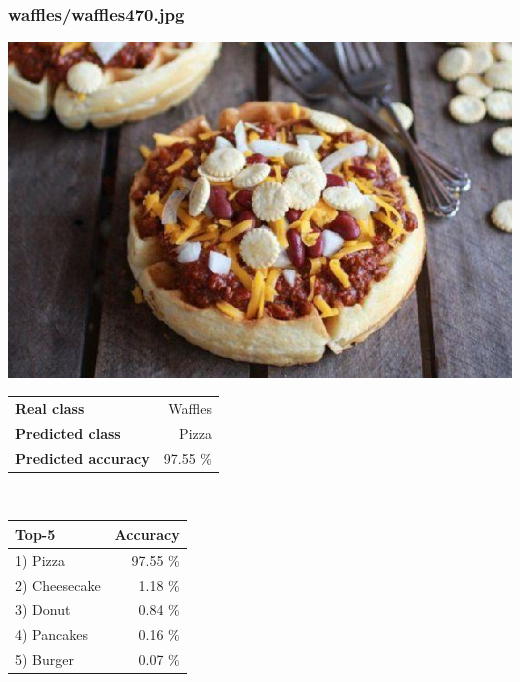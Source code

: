 \subsubsection{waffles/waffles470.jpg}

\begin{minipage}[t]{0.4\textwidth}
	\vspace{0pt}
	\includegraphics[width=\linewidth]{images/evaluation-images/waffles/waffles470.jpg}
\end{minipage}
\hfill
\begin{minipage}[t]{0.5\textwidth}
	\vspace{0pt}\raggedright
	\begin{tabularx}{\textwidth}{X r}
		\small \textbf{Real class} & \small Waffles\\
		\small \textbf{Predicted class} & \small Pizza\\
		\small \textbf{Predicted accuracy} & \small 97.55 \%
    \end{tabularx}\\
    
    \vspace{6pt}
	\begin{tabularx}{\textwidth}{X r}
        \small \textbf{Top-5} & \small \textbf{Accuracy} \\
        \hline
		\small 1) Pizza & \small 97.55 \%\\\small 2) Cheesecake & \small 1.18 \%\\\small 3) Donut & \small 0.84 \%\\\small 4) Pancakes & \small 0.16 \%\\\small 5) Burger & \small 0.07 \%
    \end{tabularx}
\end{minipage}
    
